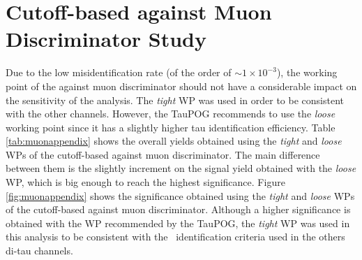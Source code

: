 \section{Cutoff-based against Muon Discriminator Study}
\label{Results:TauID-muonDicr}

\noindent Due to the low misidentification rate (of the order of $\sim1 \times 10^{-3}$), the 
working point of the against muon discriminator should not have a considerable 
impact on the sensitivity of the analysis. The \textit{tight}
WP was used in order to be consistent with the other channels. However,
the TauPOG recommends to use the \textit{loose} working point since 
it has a slightly higher tau identification efficiency. Table \ref{tab:muonappendix} shows the overall 
yields obtained using the \textit{tight} and \textit{loose} WPs of the cutoff-based against muon discriminator. The main 
difference between them is the slightly increment on the signal yield obtained 
with the \textit{loose} WP, which is big enough to reach the highest significance. Figure \ref{fig:muonappendix} shows 
the significance obtained using the \textit{tight} and \textit{loose} WPs of the 
cutoff-based against muon discriminator. Although a higher significance is obtained 
with the WP recommended by the TauPOG, the \textit{tight} WP 
was used in this analysis to be consistent with the \tauh~identification criteria 
used in the others di-tau channels.

  \begin{tiny} 
 \begin{table}[ht] 
 \caption{Signal and background yields obtained using the \textit{tight} and \textit{loose} WPs for 
 the cutoff-based against muon discriminator. \label{tab:muonappendix} }
 \end{table} 
 \end{tiny} 
 
